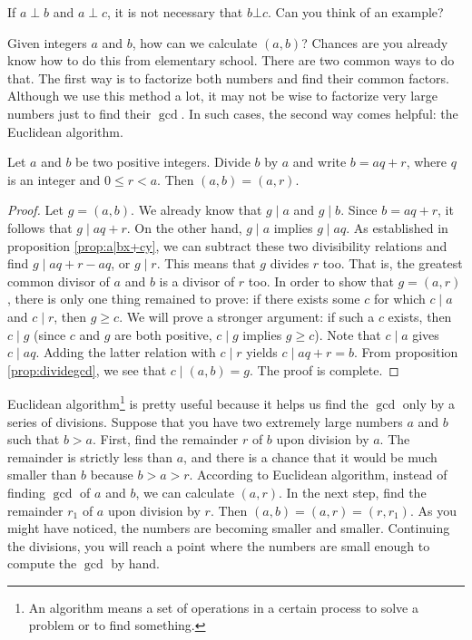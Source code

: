 \documentclass{subfile}
\begin{document}
	\begin{note}[2]
		If $a\perp b$ and $a\perp c$, it is not necessary that $b \bot c$. Can you think of an example?
	\end{note}

	Given integers $a$ and $b$, how can we calculate $(a,b)$? Chances are you already know how to do this from elementary school. There are two common ways to do that. The first way is to factorize both numbers and find their common factors. Although we use this method a lot, it may not be wise to factorize very large numbers just to find their $\gcd$. In such cases, the second way comes helpful: the Euclidean algorithm.

	\begin{theorem}
		Let $a$ and $b$ be two positive integers. Divide $b$ by $a$ and write $b=aq+r$, where $q$ is an integer and $0\leq r<a$. Then $(a,b)=(a,r)$.
	\end{theorem}

	\begin{proof}
		Let $g= (a,b)$. We already know that $g\mid a$ and $g\mid b$. Since $b=aq+r$, it follows that $g\mid aq+r$. On the other hand, $g\mid a$ implies $g\mid aq$. As established in proposition \eqref{prop:a|bx+cy}, we can subtract these two divisibility relations and find $g\mid aq+r-aq$, or $g\mid r$. This means that $g$ divides $r$ too. That is, the greatest common divisor of $a$ and $b$ is a divisor of $r$ too. In order to show that $g=(a,r)$, there is only one thing remained to prove: if there exists some $c$ for which $c\mid a$ and $c\mid r$, then $g \geq c$. We will prove a stronger argument: if such a $c$ exists, then $c\mid g$ (since $c$ and $g$ are both positive, $c\mid g$ implies $g \geq c$). Note that $c\mid a$ gives $c\mid aq$. Adding the latter relation with $c\mid r$ yields $c\mid aq+r = b$. From proposition \eqref{prop:dividegcd}, we see that $c\mid (a,b)=g$. The proof is complete.
	\end{proof}

	Euclidean algorithm\footnote{An algorithm means a set of operations in a certain process to solve a problem or to find something.} is pretty useful because it helps us find the $\gcd$ only by a series of divisions. Suppose that you have two extremely large numbers $a$ and $b$ such that $b>a$. First, find the remainder $r$ of $b$ upon division by $a$. The remainder is strictly less than $a$, and there is a chance that it would be much smaller than $b$ because $b>a>r$. According to Euclidean algorithm, instead of finding $\gcd$ of $a$ and $b$, we can calculate $(a,r)$. In the next step, find the remainder $r_1$ of $a$ upon division by $r$. Then $(a,b)=(a,r)=(r,r_1)$. As you might have noticed, the numbers are becoming smaller and smaller. Continuing the divisions, you will reach a point where the numbers are small enough to compute the $\gcd$ by hand.
\end{document}
